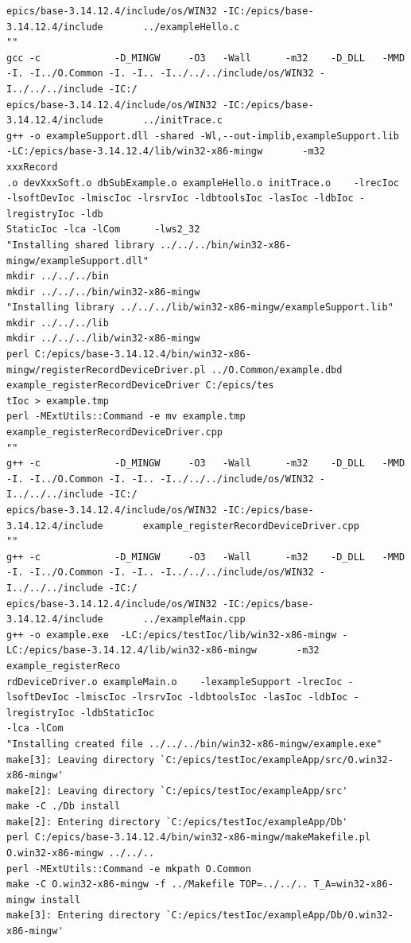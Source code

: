\documentclass[11pt
  , a4paper
  , article
  , oneside
]{memoir}
\begin{document}
\begin{lstlisting}[style=termstyle]
epics/base-3.14.12.4/include/os/WIN32 -IC:/epics/base-3.14.12.4/include       ../exampleHello.c
""
gcc -c             -D_MINGW     -O3   -Wall      -m32    -D_DLL   -MMD -I. -I../O.Common -I. -I.. -I../../../include/os/WIN32 -I../../../include -IC:/
epics/base-3.14.12.4/include/os/WIN32 -IC:/epics/base-3.14.12.4/include       ../initTrace.c
g++ -o exampleSupport.dll -shared -Wl,--out-implib,exampleSupport.lib -LC:/epics/base-3.14.12.4/lib/win32-x86-mingw       -m32               xxxRecord
.o devXxxSoft.o dbSubExample.o exampleHello.o initTrace.o    -lrecIoc -lsoftDevIoc -lmiscIoc -lrsrvIoc -ldbtoolsIoc -lasIoc -ldbIoc -lregistryIoc -ldb
StaticIoc -lca -lCom      -lws2_32
"Installing shared library ../../../bin/win32-x86-mingw/exampleSupport.dll"
mkdir ../../../bin
mkdir ../../../bin/win32-x86-mingw
"Installing library ../../../lib/win32-x86-mingw/exampleSupport.lib"
mkdir ../../../lib
mkdir ../../../lib/win32-x86-mingw
perl C:/epics/base-3.14.12.4/bin/win32-x86-mingw/registerRecordDeviceDriver.pl ../O.Common/example.dbd example_registerRecordDeviceDriver C:/epics/tes
tIoc > example.tmp
perl -MExtUtils::Command -e mv example.tmp example_registerRecordDeviceDriver.cpp
""
g++ -c             -D_MINGW     -O3   -Wall      -m32    -D_DLL   -MMD -I. -I../O.Common -I. -I.. -I../../../include/os/WIN32 -I../../../include -IC:/
epics/base-3.14.12.4/include/os/WIN32 -IC:/epics/base-3.14.12.4/include       example_registerRecordDeviceDriver.cpp
""
g++ -c             -D_MINGW     -O3   -Wall      -m32    -D_DLL   -MMD -I. -I../O.Common -I. -I.. -I../../../include/os/WIN32 -I../../../include -IC:/
epics/base-3.14.12.4/include/os/WIN32 -IC:/epics/base-3.14.12.4/include       ../exampleMain.cpp
g++ -o example.exe  -LC:/epics/testIoc/lib/win32-x86-mingw -LC:/epics/base-3.14.12.4/lib/win32-x86-mingw       -m32               example_registerReco
rdDeviceDriver.o exampleMain.o    -lexampleSupport -lrecIoc -lsoftDevIoc -lmiscIoc -lrsrvIoc -ldbtoolsIoc -lasIoc -ldbIoc -lregistryIoc -ldbStaticIoc
-lca -lCom
"Installing created file ../../../bin/win32-x86-mingw/example.exe"
make[3]: Leaving directory `C:/epics/testIoc/exampleApp/src/O.win32-x86-mingw'
make[2]: Leaving directory `C:/epics/testIoc/exampleApp/src'
make -C ./Db install
make[2]: Entering directory `C:/epics/testIoc/exampleApp/Db'
perl C:/epics/base-3.14.12.4/bin/win32-x86-mingw/makeMakefile.pl O.win32-x86-mingw ../../..
perl -MExtUtils::Command -e mkpath O.Common
make -C O.win32-x86-mingw -f ../Makefile TOP=../../.. T_A=win32-x86-mingw install
make[3]: Entering directory `C:/epics/testIoc/exampleApp/Db/O.win32-x86-mingw'

\end{lstlisting}
\end{document}
